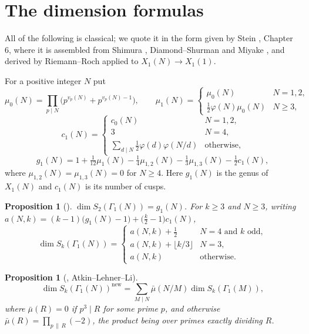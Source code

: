 \documentclass[11pt,a4paper]{article}
\theoremstyle{plain}
\newtheorem{proposition}[theorem]{Proposition}
\theoremstyle{definition}
\begin{document}
\section{The dimension formulas}

All of the following is classical; we quote it in the form given by Stein \cite{stein},
Chapter 6, where it is assembled from Shimura \cite[\S2.6]{shimura}, Diamond--Shurman
\cite[Ch.~3]{ds} and Miyake \cite[\S2.5]{miyake}, and derived by Riemann--Roch applied to
$X_{1}(N)\to X_{1}(1)$.

For a positive integer $N$ put
\[
  \mu_{0}(N)=\prod_{p\mid N}\bigl(p^{v_{p}(N)}+p^{v_{p}(N)-1}\bigr),\qquad
  \mu_{1}(N)=\begin{cases}\mu_{0}(N)&N=1,2,\\[2pt]
                          \tfrac12\varphi(N)\mu_{0}(N)&N\ge3,\end{cases}
\]
\[
  c_{1}(N)=\begin{cases}c_{0}(N)&N=1,2,\\[2pt]
                        3&N=4,\\[2pt]
                        \sum_{d\mid N}\tfrac12\varphi(d)\varphi(N/d)&\text{otherwise},
           \end{cases}
\]
\[
  g_{1}(N)=1+\tfrac1{12}\mu_{1}(N)-\tfrac14\mu_{1,2}(N)-\tfrac13\mu_{1,3}(N)
           -\tfrac12c_{1}(N),
\]
where $\mu_{1,2}(N)=\mu_{1,3}(N)=0$ for $N\ge4$. Here $g_{1}(N)$ is the genus of $X_{1}(N)$
and $c_{1}(N)$ is its number of cusps.

\begin{proposition}[{\cite[Prop.~6.6]{stein}}]\label{prop:dim}
$\dim S_{2}(\Gamma_{1}(N))=g_{1}(N)$. For $k\ge3$ and $N\ge3$, writing
$a(N,k)=(k-1)\bigl(g_{1}(N)-1\bigr)+\bigl(\tfrac{k}{2}-1\bigr)c_{1}(N)$,
\[
  \dim S_{k}(\Gamma_{1}(N))=\begin{cases}
    a(N,k)+\tfrac12&N=4\text{ and }k\text{ odd},\\[2pt]
    a(N,k)+\lfloor k/3\rfloor&N=3,\\[2pt]
    a(N,k)&\text{otherwise}.\end{cases}
\]
\end{proposition}

\begin{proposition}[{\cite[Prop.~6.6]{stein}}, Atkin--Lehner--Li]\label{prop:sieve}
\[
  \dim S_{k}(\Gamma_{1}(N))^{\mathrm{new}}
  =\sum_{M\mid N}\bar\mu(N/M)\dim S_{k}(\Gamma_{1}(M)),
\]
where $\bar\mu(R)=0$ if $p^{3}\mid R$ for some prime $p$, and otherwise
$\bar\mu(R)=\prod_{p\,\|\,R}(-2)$, the product being over primes exactly dividing $R$.
\end{proposition}
\end{document}
